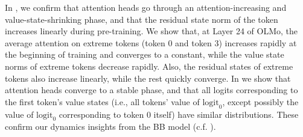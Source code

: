 In , we confirm that attention heads go through an attention-increasing and value-state-shrinking phase, and that the residual state norm of the \bos{} token increases linearly during pre-training. We show that, at Layer 24 of OLMo, the average attention on extreme tokens (token \(0\) and token \(3\)) increases rapidly at the beginning of training and converges to a constant, while the value state norms of extreme tokens decrease rapidly. Also, the residual states of extreme tokens also increase linearly, while the rest quickly converge. In  we show that attention heads converge to a stable phase, and that all logits corresponding to the first token's value states (i.e., all tokens' value of \(\mathrm{logit}_{0}\), except possibly the value of \(\mathrm{logit}_{0}\) corresponding to token \(0\) itself) have similar distributions. These confirm our dynamics insights from the BB model (c.f. ). %

